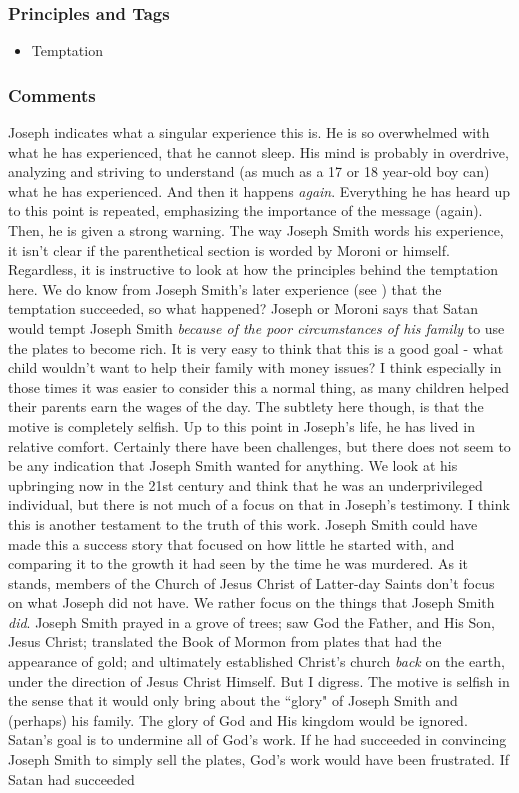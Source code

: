 \documentclass[12pt]{report}
\begin{document}
\subsubsection{Principles and Tags\label{js:principles13}}
\begin{itemize}
\item {}Temptation
\end{itemize}

\subsubsection{Comments\label{js:comments13}}
Joseph indicates what a singular experience this is.  He is so overwhelmed with what he has experienced, that he cannot sleep.  His mind is probably in overdrive, analyzing and striving to understand (as much as a 17 or 18 year-old boy can) what he has experienced.  And then it happens \emph{again}.  Everything he has heard up to this point is repeated, emphasizing the importance of the message (again). Then, he is given a strong warning.  The way Joseph Smith words his experience, it isn't clear if the parenthetical section is worded by Moroni or himself.  Regardless, it is instructive to look at how the principles behind the temptation here.  We do know from Joseph Smith's later experience (see ) that the temptation succeeded, so what happened?  Joseph or Moroni says that Satan would tempt Joseph Smith \emph{because of the poor circumstances of his family} to use the plates to become rich.  It is very easy to think that this is a good goal - what child wouldn't want to help their family with money issues?  I think especially in those times it was easier to consider this a normal thing, as many children helped their parents earn the wages of the day.  The subtlety here though, is that the motive is completely selfish.  Up to this point in Joseph's life, he has lived in relative comfort.  Certainly there have been challenges, but there does not seem to be any indication that Joseph Smith wanted for anything.  We look at his upbringing now in the 21st century and think that he was an underprivileged individual, but there is not much of a focus on that in Joseph's testimony.  I think this is another testament to the truth of this work.  Joseph Smith could have made this a success story that focused on how little he started with,  and comparing it to the growth it had seen by the time he was murdered.  As it stands, members of the Church of Jesus Christ of Latter-day Saints don't focus on what Joseph did not have.  We rather focus on the things that Joseph Smith \emph{did}.  Joseph Smith prayed in a grove of trees; saw God the Father, and His Son, Jesus Christ; translated the Book of Mormon from plates that had the appearance of gold; and ultimately established Christ's church \emph{back} on the earth, under the direction of Jesus Christ Himself.  But I digress.  The motive is selfish in the sense that it would only bring about the ``glory" of Joseph Smith and (perhaps) his family.  The glory of God and His kingdom would be ignored.  Satan's goal is to undermine all of God's work.  If he had succeeded in convincing Joseph Smith to simply sell the plates, God's work would have been frustrated.  If Satan had succeeded 
\end{document}
